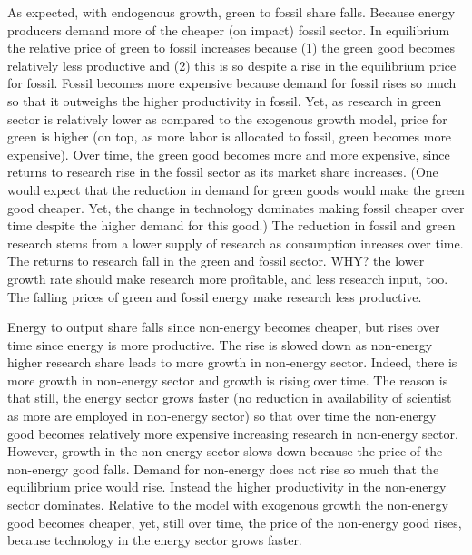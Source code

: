 \documentclass[12pt]{article}
\begin{document}
As expected, with endogenous growth, green to fossil share falls. Because energy producers demand more of the cheaper (on impact) fossil sector. In equilibrium the relative price of green to fossil increases because (1) the green good becomes relatively less productive and (2) this is so despite a rise in the equilibrium price for fossil. Fossil becomes more expensive because demand for fossil rises so much so that it outweighs the higher productivity in fossil.  Yet, as research in green sector is relatively lower as compared to the exogenous growth model, price for green is higher (on top, as more labor is allocated to fossil, green becomes more expensive). Over time, the green good becomes more and more expensive, since returns to research rise in the fossil sector as its market share increases. (One would expect that the reduction in demand for green goods would make the green good cheaper. Yet, the change in technology dominates making fossil cheaper over time despite the higher demand for this good.)
The reduction in fossil and green research stems from a lower supply of research as consumption inreases over time. The returns to research fall in the green and fossil sector. WHY? the lower growth rate should make research more profitable, and less research input, too. The falling prices of green and fossil energy make research less productive. 

Energy to output share falls since non-energy becomes cheaper, but rises over time since energy is more productive. The rise is slowed down as non-energy higher research share leads to more growth in non-energy sector. Indeed, there is more growth in non-energy sector and growth is rising over time. The reason is that still, the energy sector grows faster (no reduction in availability of scientist as more are employed in non-energy sector) so that over time the non-energy good becomes relatively more expensive increasing research in non-energy sector. However, growth in the non-energy sector slows down because the price of the non-energy good falls. Demand for non-energy does not rise so much that the equilibrium price would rise. Instead the higher productivity in the non-energy sector dominates. Relative to the model with exogenous growth the non-energy good becomes cheaper, yet, still over time, the price of the non-energy good rises, because technology in the energy sector grows faster.
\end{document}
